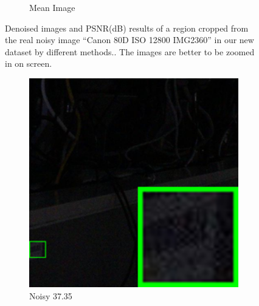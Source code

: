 \begin{figure}
\begin{subfigure}[t]{0.19\textwidth}
\caption{Mean Image}
    \end{subfigure}
    \caption{Denoised images and PSNR(dB) results of a region cropped from the real noisy image ``Canon 80D ISO 12800 IMG2360'' in our new dataset by different methods.. The images are better to be zoomed in on screen.}
    \label{fig3-19}
\end{figure}

\begin{figure}
    \centering
    \begin{subfigure}[t]{0.19\textwidth}
        \centering
        \includegraphics[width=1\textwidth]{images/guided/our/resize_br_Noisy_SONY_A7II_ISO6400_DSC03017_part5.png}
		\caption{Noisy 37.35}
    \end{subfigure}
    \hfill
    \begin{subfigure}[t]{0.19\textwidth}
        \centering

\end{subfigure}
\end{figure}
